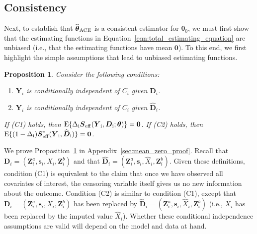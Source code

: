 \documentclass[12pt]{article}
\def\wh{\widehat}
\def\wh{\widehat}
\def\bS{{\mathbf S}}
\def\bzero{{\mathbf 0}}
\def\btheta{{\boldsymbol{\theta}}}
\def\bzero{{\boldsymbol{0}}}
\def\bs{{\boldsymbol s}}
\def\bD{{\boldsymbol D}}
\def\bS{{\boldsymbol S}}
\def\bY{{\boldsymbol Y}}
\def\bZ{{\boldsymbol Z}}
\def\tilD{\bD}
\def\ACEest{\wh{\btheta}_{\rm ACE}}
\def\E{\rm E}
\newtheorem{proposition}{Proposition}
\begin{document}
\subsection{Consistency}
\label{sec:consistency}

Next, to establish that $\ACEest$ is a consistent estimator for $\btheta_0$, we must first show that the estimating functions in Equation~\eqref{eqn:total_estimating_equation} are unbiased (i.e., that the estimating functions have mean $\bzero$). To this end, we first highlight the simple assumptions that lead to unbiased estimating functions. 

\begin{proposition}
\label{prop:mean_zero}
Consider the following conditions:
\begin{enumerate}
    \item[(C1)] $\bY_i$ is conditionally independent of $C_i$ given $\tilD_i$.
    \item[(C2)] $\bY_i$ is conditionally independent of $C_i$ given $\widehat{\tilD}_i$.
\end{enumerate}
If (C1) holds, then $\E\{\Delta_i\bS_{\rm{eff}}(\bY_i,\tilD_i;\btheta)\} = \bzero$.
If (C2) holds, then  $\E\{(1-\Delta_i)\bS_{\rm{eff}}^*(\bY_i,\widehat{\tilD}_i)\} = \bzero$. %
\end{proposition}

We prove Proposition~\ref{prop:mean_zero} in Appendix~\ref{sec:mean_zero_proof}. Recall that $\tilD_i=(\bZ^a_i, \bs_i, X_i, \bZ^b_i)$ and that $\widehat{\tilD}_i=(\bZ^a_i, \bs_i, \widehat{X}_i, \bZ^b_i)$. Given these definitions, condition (C1) is equivalent to the claim that once we have observed all covariates of interest, the censoring variable itself gives us no new information about the outcome. Condition (C2) is similar to condition (C1), except that $\tilD_i=(\bZ^a_i, \bs_i, X_i, \bZ^b_i)$ has been replaced by $\widehat{\tilD}_i=(\bZ^a_i, \bs_i, \widehat{X}_i, \bZ^b_i)$ (i.e., $X_i$ has been replaced by the imputed value $\widehat{X}_i$). Whether these conditional independence assumptions are valid will depend on the model and data at hand.
\end{document}
